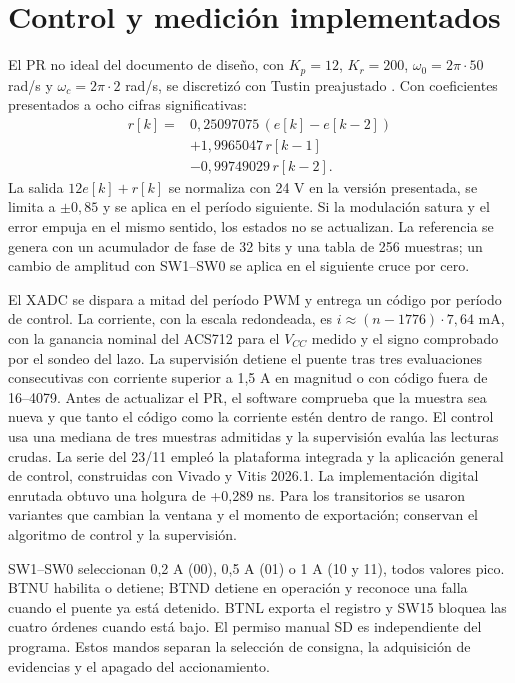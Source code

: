 \documentclass[conference]{IEEEtran}
\begin{document}
\section{Control y medición implementados}
El PR no ideal del documento de diseño, con $K_p=12$, $K_r=200$, $\omega_0=2\pi\cdot50$ rad/s y $\omega_c=2\pi\cdot2$ rad/s, se discretizó con Tustin preajustado \cite{pr,yepes}. Con coeficientes presentados a ocho cifras significativas:
\begin{align}
r[k]={}&0{,}25097075\,(e[k]-e[k-2])\nonumber\\
&+1{,}9965047\,r[k-1]\nonumber\\
&-0{,}99749029\,r[k-2].
\end{align}
La salida $12e[k]+r[k]$ se normaliza con 24 V en la versión presentada, se limita a $\pm0{,}85$ y se aplica en el período siguiente. Si la modulación satura y el error empuja en el mismo sentido, los estados no se actualizan. La referencia se genera con un acumulador de fase de 32 bits y una tabla de 256 muestras; un cambio de amplitud con SW1--SW0 se aplica en el siguiente cruce por cero.

El XADC se dispara a mitad del período PWM y entrega un código por período de control. La corriente, con la escala redondeada, es $i\approx(n-1776)\cdot7{,}64$ mA, con la ganancia nominal del ACS712 para el $V_{CC}$ medido y el signo comprobado por el sondeo del lazo. La supervisión detiene el puente tras tres evaluaciones consecutivas con corriente superior a 1,5 A en magnitud o con código fuera de 16--4079. Antes de actualizar el PR, el software comprueba que la muestra sea nueva y que tanto el código como la corriente estén dentro de rango. El control usa una mediana de tres muestras admitidas y la supervisión evalúa las lecturas crudas. La serie del 23/11 empleó la plataforma integrada y la aplicación general de control, construidas con Vivado y Vitis 2026.1. La implementación digital enrutada obtuvo una holgura de +0,289 ns. Para los transitorios se usaron variantes que cambian la ventana y el momento de exportación; conservan el algoritmo de control y la supervisión.

SW1--SW0 seleccionan 0,2 A (00), 0,5 A (01) o 1 A (10 y 11), todos valores pico. BTNU habilita o detiene; BTND detiene en operación y reconoce una falla cuando el puente ya está detenido. BTNL exporta el registro y SW15 bloquea las cuatro órdenes cuando está bajo. El permiso manual SD es independiente del programa. Estos mandos separan la selección de consigna, la adquisición de evidencias y el apagado del accionamiento.
\end{document}
